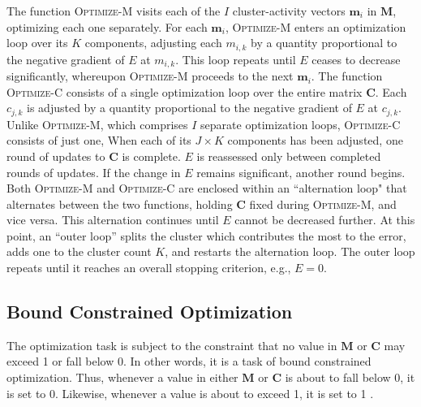 The function \textsc{Optimize-M} visits each of the $I$ cluster-activity vectors $\mathbf{m}_i$ in
$\mathbf{M}$, optimizing each one separately.
For each $\mathbf{m}_i$, \textsc{Optimize-M} enters an optimization 
loop over its $K$ components, adjusting each 
$m_{i,k}$ by a
quantity proportional to the negative gradient of $E$ at $m_{i,k}$.  
This loop repeats until $E$
ceases to decrease significantly,
whereupon \textsc{Optimize-M} proceeds to the next $\mathbf{m}_i$.  
The function \textsc{Optimize-C} consists of a single optimization loop over the 
entire matrix
$\mathbf{C}$. Each $c_{j,k}$ is adjusted by a quantity
proportional to the negative gradient of $E$ at $c_{j,k}$.
Unlike \textsc{Optimize-M}, which comprises $I$ separate optimization
loops, \textsc{Optimize-C} consists of just one, 
When each of its $J \times K$
components has been adjusted, one round of updates to $\mathbf{C}$ is
complete.  $E$ is reassessed only between completed rounds of
updates. If the change in $E$ remains significant, another round begins.  
Both \textsc{Optimize-M} and \textsc{Optimize-C} are enclosed within 
an ``alternation loop" 
that alternates between the two functions, holding $\mathbf{C}$ fixed
during \textsc{Optimize-M}, and vice versa.
This alternation continues until $E$ cannot be decreased further. At
this point, an ``outer loop''
splits the cluster which contributes the most to the error, adds one
to the cluster count $K$, and restarts the alternation loop. The outer loop
repeats until it reaches an overall stopping criterion, e.g., $E = 0$.
 \subsection{Bound Constrained Optimization}
The optimization task is subject to the constraint %
that no value in $\mathbf{M}$ or $\mathbf{C}$ may exceed 1 or fall below 0. In other words,
it is a task of bound constrained optimization. Thus, whenever a value in either $\mathbf{M}$ or $\mathbf{C}$ is about
to fall below 0, it is set to 0. Likewise, whenever a value is about to exceed 1, it is set to 1
\citep{ni:yuan:1997}.
  
